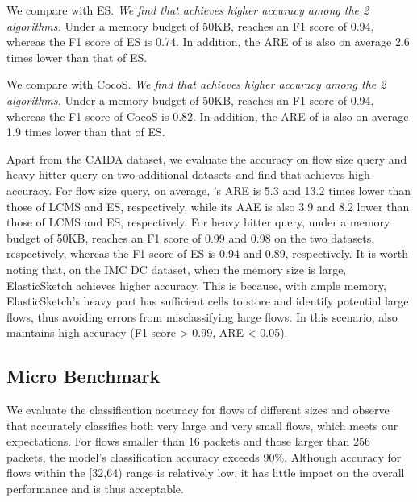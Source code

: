 %
We compare \alg{} with ES. \textit{We find that \alg{} achieves higher accuracy among the 2 algorithms.} Under a memory budget of 50KB, \alg{} reaches an F1 score of 0.94, whereas the F1 score of ES is 0.74. In addition, the ARE of \alg{} is also on average 2.6 times lower than that of ES.




%
We compare \alg{} with CocoS. \textit{We find that \alg{} achieves higher accuracy among the 2 algorithms.} Under a memory budget of 50KB, \alg{} reaches an F1 score of 0.94, whereas the F1 score of CocoS is 0.82. In addition, the ARE of \alg{} is also on average 1.9 times lower than that of ES.




%
Apart from the CAIDA dataset, we evaluate the accuracy on flow size query and heavy hitter query on two additional datasets and find that \alg{} achieves high accuracy.
%
For flow size query, on average, \alg{}’s ARE is 5.3 and 13.2 times lower than those of LCMS and ES, respectively, while its AAE is also 3.9 and 8.2 lower than those of LCMS and ES, respectively.
%
For heavy hitter query, under a memory budget of 50KB, \alg{} reaches an F1 score of 0.99 and 0.98 on the two datasets, respectively, whereas the F1 score of ES is 0.94 and 0.89, respectively.
%
It is worth noting that, on the IMC DC dataset, when the memory size is large, ElasticSketch achieves higher accuracy. This is because, with ample memory, ElasticSketch’s heavy part has sufficient cells to store and identify potential large flows, thus avoiding errors from misclassifying large flows. In this scenario, \alg{} also maintains high accuracy (F1 score > 0.99, ARE < 0.05).




\subsection{Micro Benchmark}






 We evaluate the classification accuracy for flows of different sizes and observe that \alg{} accurately classifies both very large and very small flows, which meets our expectations. For flows smaller than 16 packets and those larger than 256 packets, the model’s classification accuracy exceeds 90\%. Although accuracy for flows within the [32,64) range is relatively low, it has little impact on the overall performance and is thus acceptable.




